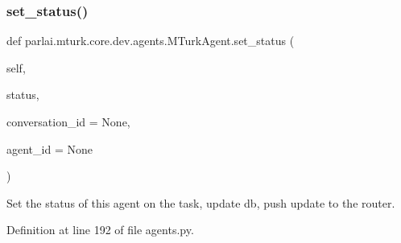 \subsubsection{\texorpdfstring{set\+\_\+status()}{set\_status()}}
{\footnotesize\ttfamily def parlai.\+mturk.\+core.\+dev.\+agents.\+M\+Turk\+Agent.\+set\+\_\+status (\begin{DoxyParamCaption}\item[{}]{self,  }\item[{}]{status,  }\item[{}]{conversation\+\_\+id = {\ttfamily None},  }\item[{}]{agent\+\_\+id = {\ttfamily None} }\end{DoxyParamCaption})}

\begin{DoxyVerb}Set the status of this agent on the task, update db, push update to the router.
\end{DoxyVerb}
 

Definition at line 192 of file agents.\+py.


